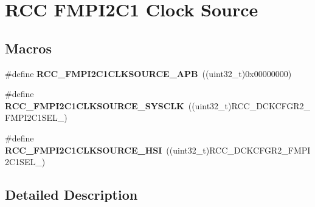 \hypertarget{group___r_c_c_ex___f_m_p_i2_c1___clock___source}{}\section{R\+CC F\+M\+P\+I2\+C1 Clock Source}
\label{group___r_c_c_ex___f_m_p_i2_c1___clock___source}
\subsection*{Macros}
\begin{DoxyCompactItemize}
\item 
\#define {\bfseries R\+C\+C\+\_\+\+F\+M\+P\+I2\+C1\+C\+L\+K\+S\+O\+U\+R\+C\+E\+\_\+\+A\+PB}~((uint32\+\_\+t)0x00000000)\hypertarget{group___r_c_c_ex___f_m_p_i2_c1___clock___source_ga70931272f9ab715e045f7c453088839f}{}\label{group___r_c_c_ex___f_m_p_i2_c1___clock___source_ga70931272f9ab715e045f7c453088839f}

\item 
\#define {\bfseries R\+C\+C\+\_\+\+F\+M\+P\+I2\+C1\+C\+L\+K\+S\+O\+U\+R\+C\+E\+\_\+\+S\+Y\+S\+C\+LK}~((uint32\+\_\+t)R\+C\+C\+\_\+\+D\+C\+K\+C\+F\+G\+R2\+\_\+\+F\+M\+P\+I2\+C1\+S\+E\+L\+\_)\hypertarget{group___r_c_c_ex___f_m_p_i2_c1___clock___source_ga21d8f31afaa8bc77be32f33518d9c42a}{}\label{group___r_c_c_ex___f_m_p_i2_c1___clock___source_ga21d8f31afaa8bc77be32f33518d9c42a}

\item 
\#define {\bfseries R\+C\+C\+\_\+\+F\+M\+P\+I2\+C1\+C\+L\+K\+S\+O\+U\+R\+C\+E\+\_\+\+H\+SI}~((uint32\+\_\+t)R\+C\+C\+\_\+\+D\+C\+K\+C\+F\+G\+R2\+\_\+\+F\+M\+P\+I2\+C1\+S\+E\+L\+\_)\hypertarget{group___r_c_c_ex___f_m_p_i2_c1___clock___source_gad9aece54659d948d4e6693d151118998}{}\label{group___r_c_c_ex___f_m_p_i2_c1___clock___source_gad9aece54659d948d4e6693d151118998}

\end{DoxyCompactItemize}


\subsection{Detailed Description}
